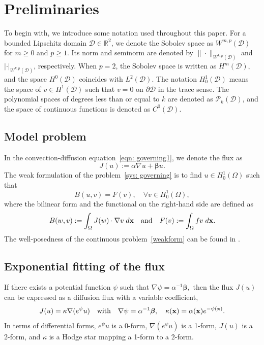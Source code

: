\documentclass[a4paper]{article}
\theoremstyle{plain}
\theoremstyle{definition}
\numberwithin{equation}{section}
\newcommand{\bx}{{\bf x}}
\begin{document}
\section{Preliminaries} \label{sec:pre}

To begin with, we introduce some notation used throughout this paper.
For a bounded Lipschitz domain $\mathcal{D}\in\mathbb{R}^2$, we denote the Sobolev space as $W^{m,p}(\mathcal{D})$ for $m\geq 0$ and $p\geq 1$.
Its norm and seminorm are denoted by $\|\cdot\|_{W^{k,p}(\mathcal{D})}$ and $|\cdot|_{W^{k,p}(\mathcal{D})}$, respectively.
When $p=2$, the Sobolev space is written as $H^m(\mathcal{D})$, and the space $H^0(\mathcal{D})$ coincides with $L^2(\mathcal{D})$.
The notation $H_0^1(\mathcal{D})$ means the space of $v\in H^1(\mathcal{D})$ such that $v=0$ on $\partial\mathcal{D}$ in the trace sense.
The polynomial spaces of degrees less than or equal to $k$ are denoted as $\mathcal{P}_k(\mathcal{D})$, and the space of continuous functions is denoted as $C^0(\mathcal{D})$.




\subsection{Model problem}
In the convection-diffusion equation~\eqref{eqn: governing1}, we denote the flux as
\begin{equation}
J(u) := \alpha \nabla u+\bm{\beta}u.\label{flux}
\end{equation}
The weak formulation of the problem~\eqref{sys: governing} is to find $u\in H_0^1(\Omega)$ such that
\begin{equation}
B(u,v)=F(v),\quad \forall v\in H_0^1(\Omega),\label{weakform}
\end{equation}
where the bilinear form and the functional on the right-hand side are defined as
\begin{equation*}
B(w,v):=\int_\Omega J(w)\cdot \nabla v\;{\rm d}\mathbf{x}\quad\text{and}\quad F(v) :=\int_\Omega fv\;{\rm d}\mathbf{x}.
\end{equation*}
The well-posedness of the continuous problem~\eqref{weakform} can be found in \cite{gilbarg1977elliptic}. 


\subsection{Exponential fitting of the flux}
If there exists a potential function $\psi$ such that $
\nabla\psi  = \alpha^{-1}\bm{\beta},$
then the flux $J(u)$ can be expressed as a diffusion flux with a variable coefficient,
\begin{equation*}
J(u) = \kappa\nabla (e^{\psi} u)\quad \text{with}\quad\nabla\psi  = \alpha^{-1}\bm{\beta}, \quad\kappa(\bx)=\alpha(\bx) e^{-\psi(\bx)}.
\end{equation*}
In terms of differential forms, $e^{\psi}u$ is a 0-form, $\nabla(e^{\psi}u)$ is a 1-form, $J(u)$ is a 2-form, and $\kappa$ is a Hodge star mapping a 1-form to a 2-form.
\end{document}
